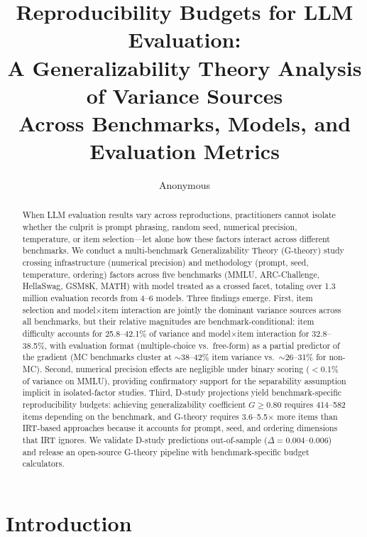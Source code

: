 \documentclass[11pt]{article}
\title{Reproducibility Budgets for LLM Evaluation:\\
A Generalizability Theory Analysis of Variance Sources\\
Across Benchmarks, Models, and Evaluation Metrics}
\author{Anonymous}
\date{}
\begin{document}
\maketitle

\begin{abstract}
When LLM evaluation results vary across reproductions, practitioners cannot isolate whether the culprit is prompt phrasing, random seed, numerical precision, temperature, or item selection---let alone how these factors interact across different benchmarks.
We conduct a multi-benchmark Generalizability Theory (G-theory) study crossing infrastructure (numerical precision) and methodology (prompt, seed, temperature, ordering) factors across five benchmarks (MMLU, ARC-Challenge, HellaSwag, GSM8K, MATH) with model treated as a crossed facet, totaling over 1.3 million evaluation records from 4--6 models.
Three findings emerge.
First, item selection and model$\times$item interaction are jointly the dominant variance sources across all benchmarks, but their relative magnitudes are benchmark-conditional: item difficulty accounts for 25.8--42.1\% of variance and model$\times$item interaction for 32.8--38.5\%, with evaluation format (multiple-choice vs.\ free-form) as a partial predictor of the gradient (MC benchmarks cluster at $\sim$38--42\% item variance vs.\ $\sim$26--31\% for non-MC).
Second, numerical precision effects are negligible under binary scoring ($<$0.1\% of variance on MMLU), providing confirmatory support for the separability assumption implicit in isolated-factor studies.
Third, D-study projections yield benchmark-specific reproducibility budgets: achieving generalizability coefficient $G \geq 0.80$ requires 414--582 items depending on the benchmark, and G-theory requires 3.6--5.5$\times$ more items than IRT-based approaches because it accounts for prompt, seed, and ordering dimensions that IRT ignores.
We validate D-study predictions out-of-sample ($\Delta = 0.004$--$0.006$) and release an open-source G-theory pipeline with benchmark-specific budget calculators.
\end{abstract}

\section{Introduction}
\label{sec:intro}
\end{document}
